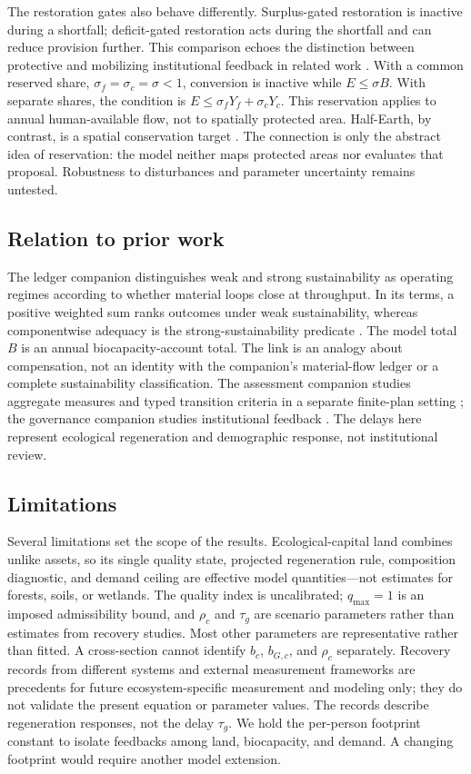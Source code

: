 \documentclass[preprint,12pt,authoryear]{elsarticle}
\begin{document}
The restoration gates also behave differently. Surplus-gated restoration is inactive during a shortfall; deficit-gated restoration acts during the shortfall and can reduce provision further. This comparison echoes the distinction between protective and mobilizing institutional feedback in related work \citep{Abaee2026a}. With a common reserved share, $\sigma_f=\sigma_c=\sigma<1$, conversion is inactive while $E\le\sigma B$. With separate shares, the condition is $E\le\sigma_fY_f+\sigma_cY_c$. This reservation applies to annual human-available flow, not to spatially protected area. Half-Earth, by contrast, is a spatial conservation target \citep{Wilson2016}. The connection is only the abstract idea of reservation: the model neither maps protected areas nor evaluates that proposal. Robustness to disturbances and parameter uncertainty remains untested.

\subsection{Relation to prior work}

The ledger companion distinguishes weak and strong sustainability as operating regimes according to whether material loops close at throughput. In its terms, a positive weighted sum ranks outcomes under weak sustainability, whereas componentwise adequacy is the strong-sustainability predicate \citep[Sections~1.1 and 10.1]{Abaee2026c}. The model total $B$ is an annual biocapacity-account total. The link is an analogy about compensation, not an identity with the companion's material-flow ledger or a complete sustainability classification. The assessment companion studies aggregate measures and typed transition criteria in a separate finite-plan setting \citep{Abaee2026b}; the governance companion studies institutional feedback \citep{Abaee2026a}. The delays here represent ecological regeneration and demographic response, not institutional review.

\subsection{Limitations}

Several limitations set the scope of the results. Ecological-capital land combines unlike assets, so its single quality state, projected regeneration rule, composition diagnostic, and demand ceiling are effective model quantities—not estimates for forests, soils, or wetlands. The quality index is uncalibrated; $q_{\max}=1$ is an imposed admissibility bound, and $\rho_c$ and $\tau_g$ are scenario parameters rather than estimates from recovery studies. Most other parameters are representative rather than fitted. A cross-section cannot identify $b_c$, $b_{G,c}$, and $\rho_c$ separately. Recovery records from different systems and external measurement frameworks are precedents for future ecosystem-specific measurement and modeling only; they do not validate the present equation or parameter values. The records describe regeneration responses, not the delay $\tau_g$. We hold the per-person footprint constant to isolate feedbacks among land, biocapacity, and demand. A changing footprint would require another model extension.
\end{document}
